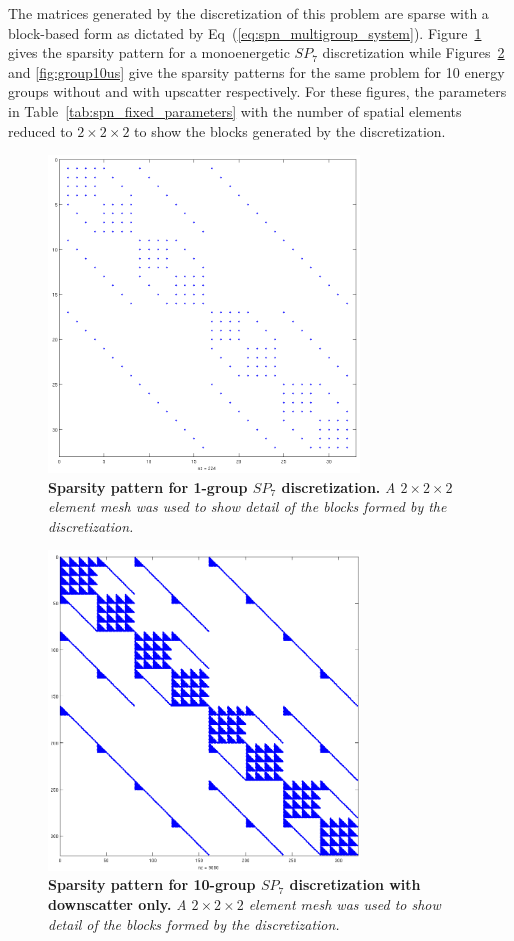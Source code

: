 The matrices generated by the discretization of this problem are
sparse with a block-based form as dictated by
Eq~(\ref{eq:spn_multigroup_system}). Figure~\ref{fig:group1} gives the
sparsity pattern for a monoenergetic $SP_7$ discretization while
Figures~\ref{fig:group10ds} and \ref{fig:group10us} give the sparsity
patterns for the same problem for 10 energy groups without and with
upscatter respectively. For these figures, the parameters in
Table~\ref{tab:spn_fixed_parameters} with the number of spatial
elements reduced to $2 \times 2 \times 2$ to show the blocks generated
by the discretization.
\begin{figure}[t!]
  \begin{center}
    \includegraphics[width=3.25in]{chapters/spn_equations/group1.png}
  \end{center}
  \caption{\textbf{Sparsity pattern for 1-group $SP_7$
      discretization.} \textit{A $2\times 2 \times 2$ element mesh was
      used to show detail of the blocks formed by the discretization.}}
  \label{fig:group1}
\end{figure}
\begin{figure}[t!]
  \begin{center}
    \includegraphics[width=3.25in]{chapters/spn_equations/group10ds.png}
  \end{center}
  \caption{\textbf{Sparsity pattern for 10-group $SP_7$ discretization
      with downscatter only.} \textit{A $2\times 2 \times 2$ element
      mesh was used to show detail of the blocks formed by the
      discretization.}}
  \label{fig:group10ds}
\end{figure}
